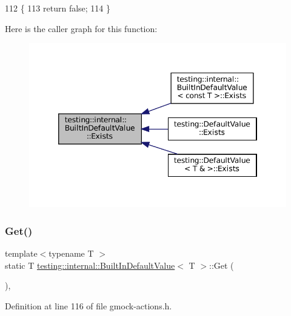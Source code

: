 \begin{DoxyCode}
112                        \{
113     \textcolor{keywordflow}{return} \textcolor{keyword}{false};
114   \}
\end{DoxyCode}
Here is the caller graph for this function\+:
\nopagebreak
\begin{figure}[H]
\begin{center}
\leavevmode
\includegraphics[width=346pt]{classtesting_1_1internal_1_1BuiltInDefaultValue_a35207bc20a493b0efb3980eb9a08dd2f_icgraph}
\end{center}
\end{figure}
\mbox{\label{classtesting_1_1internal_1_1BuiltInDefaultValue_a7e26c1df14a887c8f393b29d6ea162e6}} 
\subsubsection{\texorpdfstring{Get()}{Get()}}
{\footnotesize\ttfamily template$<$typename T $>$ \\
static T \hyperlink{classtesting_1_1internal_1_1BuiltInDefaultValue}{testing\+::internal\+::\+Built\+In\+Default\+Value}$<$ T $>$\+::Get (\begin{DoxyParamCaption}{ }\end{DoxyParamCaption})\hspace{0.3cm}{\ttfamily [inline]}, {\ttfamily [static]}}



Definition at line 116 of file gmock-\/actions.\+h.




